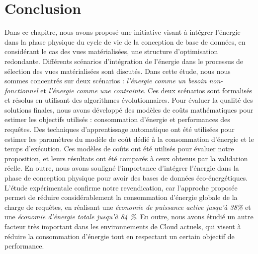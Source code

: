 \section{Conclusion}
Dans ce chapitre, nous avons proposé une initiative visant à intégrer l'énergie dans la phase physique du cycle de vie de la conception de base de données, en considérant le cas des vues matérialisées, une structure d'optimisation redondante.
Différents scénarios d'intégration de l'énergie dans le processus de sélection des vues matérialisées sont discutés. Dans cette étude, nous nous sommes concentrés sur deux scénarios : \textit{l'énergie comme un besoin non-fonctionnel} et \textit{l'énergie comme une contrainte}. Ces deux scénarios sont formalisés et résolus en utilisant des algorithmes évolutionnaires. Pour évaluer la qualité des solutions finales, nous avons développé des modèles de coûts mathématiques pour estimer les objectifs utilisés : consommation d'énergie et performances des requêtes. Des techniques d'apprentissage automatique ont été utilisées pour estimer les paramètres du modèle de coût dédié à la consommation d'énergie et le temps d'exécution. Ces modèles de coûts ont été utilisés pour évaluer notre proposition, et leurs résultats ont été comparés à ceux obtenus par la validation réelle.
En outre, nous avons souligné l'importance d'intégrer l'énergie dans la phase de conception physique pour avoir des bases de données éco-énergétiques. L'étude expérimentale confirme notre revendication, car l'approche proposée permet de réduire considérablement la consommation d'énergie globale de la charge de requêtes, en réalisant une \textit{économie de puissance active jusqu'à 38\%} et une \textit{économie d'énergie totale jusqu'à 84 \%}.
En outre, nous avons étudié un autre facteur très important dans les environnements de Cloud actuels, qui visent à réduire la consommation d'énergie tout en respectant un certain objectif de performance.
